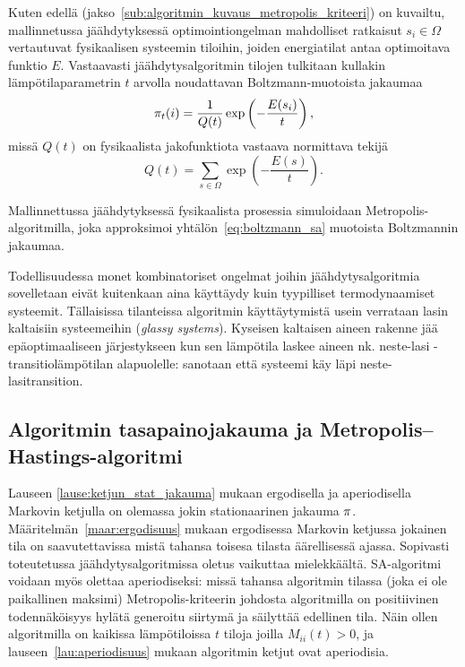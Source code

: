 Kuten edellä (jakso~\ref{sub:algoritmin_kuvaus_metropolis_kriteeri}) on kuvailtu,
mallinnetussa jäähdytyksessä optimointiongelman mahdolliset ratkaisut $s_i \in \Omega$ vertautuvat fysikaalisen systeemin tiloihin,
joiden energiatilat antaa optimoitava funktio $E$.
Vastaavasti jäähdytysalgoritmin tilojen tulkitaan kullakin lämpötilaparametrin $t$ arvolla noudattavan Boltzmann-muotoista jakaumaa
\begin{equation}
    \label{eq:boltzmann_sa}
    \mathbf{\pi}_t(i) = \frac{1}{Q(t)} \exp \left(-\frac{E(s_i)}{t}\right),
\end{equation}
missä $Q(t)$ on fysikaalista jakofunktiota vastaava normittava tekijä
\begin{equation}
    Q(t) = \sum_{s \in \Omega} \exp \left(-\frac{E(s)}{t}\right).
\end{equation}

Mallinnettussa jäähdytyksessä fysikaalista prosessia simuloidaan Metropolis-algoritmilla,
joka approksimoi yhtälön~\ref{eq:boltzmann_sa} muotoista Boltzmannin jakaumaa.

Todellisuudessa monet kombinatoriset ongelmat joihin jäähdytysalgoritmia sovelletaan eivät kuitenkaan aina käyttäydy kuin tyypilliset termodynaamiset systeemit.
Tällaisissa tilanteissa algoritmin käyttäytymistä usein verrataan lasin kaltaisiin systeemeihin (\emph{glassy systems}).
Kyseisen kaltaisen aineen rakenne jää epäoptimaaliseen järjestykseen kun sen lämpötila laskee aineen nk. neste-lasi -transitiolämpötilan alapuolelle:
sanotaan että systeemi käy läpi neste-lasitransition.
\cite[][luku 6.6]{salamonetal}

\subsection{Algoritmin tasapainojakauma ja Metropolis--Hastings-algoritmi}
\label{sub:metropolis_hastings_algoritmi}

Lauseen \ref{lause:ketjun_stat_jakauma} mukaan ergodisella ja aperiodisella Markovin ketjulla on olemassa jokin stationaarinen jakauma $\mathbf{\pi}$.
Määritelmän~\ref{maar:ergodisuus} mukaan ergodisessa Markovin ketjussa jokainen tila on saavutettavissa mistä tahansa toisesa tilasta äärellisessä ajassa.
Sopivasti toteutetussa jäähdytysalgoritmissa oletus vaikuttaa mielekkäältä.
SA-algoritmi voidaan myös olettaa aperiodiseksi:
missä tahansa algoritmin tilassa (joka ei ole paikallinen maksimi) Metropolis-kriteerin johdosta
algoritmilla on positiivinen todennäköisyys hylätä generoitu siirtymä ja säilyttää edellinen tila.
Näin ollen algoritmilla on kaikissa lämpötiloissa $t$ tiloja joilla $M_{ii}(t) > 0$,
ja lauseen~\ref{lau:aperiodisuus} mukaan algoritmin ketjut ovat aperiodisia.

